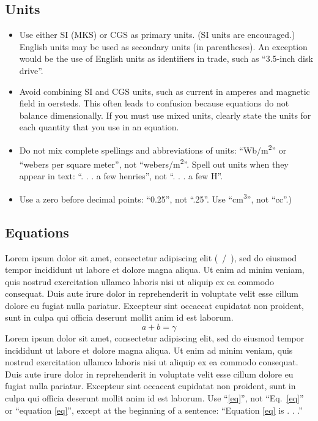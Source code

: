 \documentclass[conference]{IEEEtran}
\begin{document}
\subsection{Units}
\begin{itemize}
    \item Use either SI (MKS) or CGS as primary units. (SI units are 
    encouraged.) English units may be used as secondary units (in parentheses). 
    An exception would be the use of English units as identifiers in trade, 
    such as ``3.5-inch disk drive''.
    \item Avoid combining SI and CGS units, such as current in amperes and 
    magnetic field in oersteds. This often leads to confusion because 
    equations do not balance dimensionally. If you must use mixed units, 
    clearly state the units for each quantity that you use in an equation.
    \item Do not mix complete spellings and abbreviations of units: 
    ``Wb/m\textsuperscript{2}'' or ``webers per square meter'', not 
    ``webers/m\textsuperscript{2}''. Spell out units when they appear in 
    text: ``. . . a few henries'', not ``. . . a few H''.
    \item Use a zero before decimal points: ``0.25'', not ``.25''. Use 
    ``cm\textsuperscript{3}'', not ``cc''.)
\end{itemize}

\subsection{Equations}
    Lorem ipsum dolor sit amet, consectetur adipiscing elit (~/~), sed do eiusmod 
    tempor incididunt ut labore et dolore magna aliqua. Ut enim ad minim 
    veniam, quis nostrud exercitation ullamco laboris nisi ut aliquip ex ea 
    commodo consequat. Duis aute irure dolor in reprehenderit in voluptate 
    velit esse cillum dolore eu fugiat nulla pariatur. Excepteur sint occaecat 
    cupidatat non proident, sunt in culpa qui officia deserunt mollit anim id 
    est laborum.
\begin{equation}
a+b=\gamma\label{eq}
\end{equation}
    Lorem ipsum dolor sit amet, consectetur adipiscing elit, sed do eiusmod 
    tempor incididunt ut labore et dolore magna aliqua. Ut enim ad minim 
    veniam, quis nostrud exercitation ullamco laboris nisi ut aliquip ex ea 
    commodo consequat. Duis aute irure dolor in reprehenderit in voluptate 
    velit esse cillum dolore eu fugiat nulla pariatur. Excepteur sint occaecat 
    cupidatat non proident, sunt in culpa qui officia deserunt mollit anim id 
    est laborum. Use ``\eqref{eq}'', not ``Eq.~\eqref{eq}'' or ``equation \eqref{eq}'', except at 
    the beginning of a sentence: ``Equation \eqref{eq} is . . .''
\end{document}
